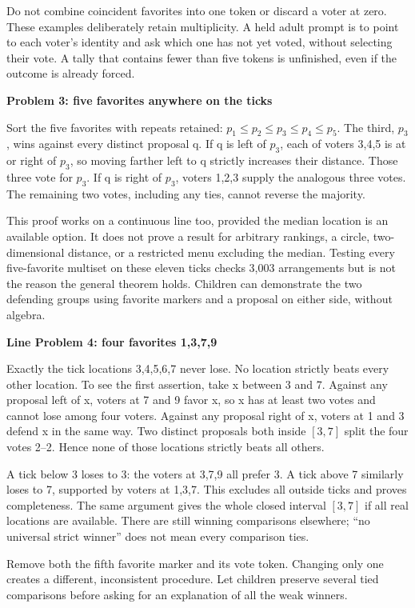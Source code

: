 \documentclass[11pt,letterpaper]{article}
\newcommand{\heading}[1]{\par\vspace{4pt}{\large\bfseries #1}\par}
\newcommand{\sub}[1]{\par\textbf{#1}\par}
\begin{document}
Do not combine coincident favorites into one token or discard a voter at zero. These examples deliberately retain multiplicity. A held adult prompt is to point to each voter's identity and ask which one has not yet voted, without selecting their vote. A tally that contains fewer than five tokens is unfinished, even if the outcome is already forced.

\sub{Problem 3: five favorites anywhere on the ticks}
Sort the five favorites with repeats retained: $p_1\leq p_2\leq p_3\leq p_4\leq p_5$. The third, $p_3$, wins against every distinct proposal q. If q is left of $p_3$, each of voters 3,4,5 is at or right of $p_3$, so moving farther left to q strictly increases their distance. Those three vote for $p_3$. If q is right of $p_3$, voters 1,2,3 supply the analogous three votes. The remaining two votes, including any ties, cannot reverse the majority.

This proof works on a continuous line too, provided the median location is an available option. It does not prove a result for arbitrary rankings, a circle, two-dimensional distance, or a restricted menu excluding the median. Testing every five-favorite multiset on these eleven ticks checks 3,003 arrangements but is not the reason the general theorem holds. Children can demonstrate the two defending groups using favorite markers and a proposal on either side, without algebra.
\newpage
\heading{Limits and explanations: return investigations}
\sub{Line Problem 4: four favorites 1,3,7,9}
Exactly the tick locations 3,4,5,6,7 never lose. No location strictly beats every other location. To see the first assertion, take x between 3 and 7. Against any proposal left of x, voters at 7 and 9 favor x, so x has at least two votes and cannot lose among four voters. Against any proposal right of x, voters at 1 and 3 defend x in the same way. Two distinct proposals both inside $[3,7]$ split the four votes 2--2. Hence none of those locations strictly beats all others.

A tick below 3 loses to 3: the voters at 3,7,9 all prefer 3. A tick above 7 similarly loses to 7, supported by voters at 1,3,7. This excludes all outside ticks and proves completeness. The same argument gives the whole closed interval $[3,7]$ if all real locations are available. There are still winning comparisons elsewhere; ``no universal strict winner'' does not mean every comparison ties.

Remove both the fifth favorite marker and its vote token. Changing only one creates a different, inconsistent procedure. Let children preserve several tied comparisons before asking for an explanation of all the weak winners.
\end{document}
